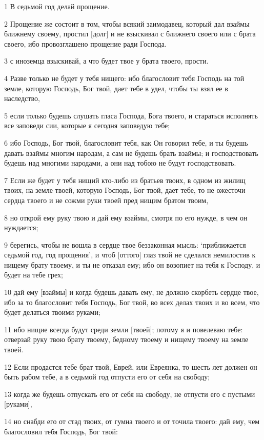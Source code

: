 \par 1 В седьмой год делай прощение.
\par 2 Прощение же состоит в том, чтобы всякий заимодавец, который дал взаймы ближнему своему, простил [долг] и не взыскивал с ближнего своего или с брата своего, ибо провозглашено прощение ради Господа.
\par 3 с иноземца взыскивай, а что будет твое у брата твоего, прости.
\par 4 Разве только не будет у тебя нищего: ибо благословит тебя Господь на той земле, которую Господь, Бог твой, дает тебе в удел, чтобы ты взял ее в наследство,
\par 5 если только будешь слушать гласа Господа, Бога твоего, и стараться исполнять все заповеди сии, которые я сегодня заповедую тебе;
\par 6 ибо Господь, Бог твой, благословит тебя, как Он говорил тебе, и ты будешь давать взаймы многим народам, а сам не будешь брать взаймы; и господствовать будешь над многими народами, а они над тобою не будут господствовать.
\par 7 Если же будет у тебя нищий кто-либо из братьев твоих, в одном из жилищ твоих, на земле твоей, которую Господь, Бог твой, дает тебе, то не ожесточи сердца твоего и не сожми руки твоей пред нищим братом твоим,
\par 8 но открой ему руку твою и дай ему взаймы, смотря по его нужде, в чем он нуждается;
\par 9 берегись, чтобы не вошла в сердце твое беззаконная мысль: `приближается седьмой год, год прощения', и чтоб [оттого] глаз твой не сделался немилостив к нищему брату твоему, и ты не отказал ему; ибо он возопиет на тебя к Господу, и будет на тебе грех;
\par 10 дай ему [взаймы] и когда будешь давать ему, не должно скорбеть сердце твое, ибо за то благословит тебя Господь, Бог твой, во всех делах твоих и во всем, что будет делаться твоими руками;
\par 11 ибо нищие всегда будут среди земли [твоей]; потому я и повелеваю тебе: отверзай руку твою брату твоему, бедному твоему и нищему твоему на земле твоей.
\par 12 Если продастся тебе брат твой, Еврей, или Евреянка, то шесть лет должен он быть рабом тебе, а в седьмой год отпусти его от себя на свободу;
\par 13 когда же будешь отпускать его от себя на свободу, не отпусти его с пустыми [руками],
\par 14 но снабди его от стад твоих, от гумна твоего и от точила твоего: дай ему, чем благословил тебя Господь, Бог твой:
